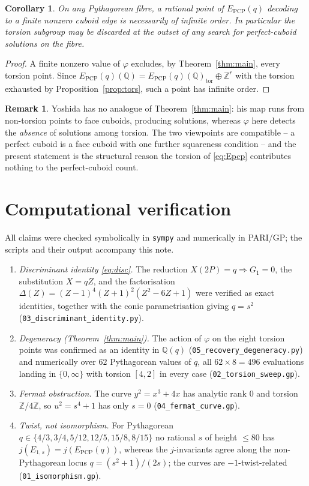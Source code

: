 \documentclass[11pt,reqno]{amsart}
\theoremstyle{plain}
\newtheorem{corollary}{Corollary}
\theoremstyle{definition}
\newtheorem{remark}{Remark}
\newcommand{\Q}{\mathbb{Q}}
\newcommand{\Z}{\mathbb{Z}}
\newcommand{\Epcp}{E_{\mathrm{PCP}}}
\begin{document}
\begin{corollary}\label{cor:nontorsion}
On any Pythagorean fibre, a rational point of $\Epcp(q)$ decoding to a finite nonzero
cuboid edge is necessarily of infinite order. In particular the torsion subgroup may be
discarded at the outset of any search for perfect-cuboid solutions on the fibre.
\end{corollary}

\begin{proof}
A finite nonzero value of $\varphi$ excludes, by Theorem~\ref{thm:main}, every torsion
point. Since $\Epcp(q)(\Q)=\Epcp(q)(\Q)_{\mathrm{tor}}\oplus\Z^{r}$ with the torsion
exhausted by Proposition~\ref{prop:tors}, such a point has infinite order.
\end{proof}

\begin{remark}
Yoshida \cite{Yoshida} has no analogue of Theorem~\ref{thm:main}: his map runs from
non-torsion points to face cuboids, producing solutions, whereas $\varphi$ here detects
the \emph{absence} of solutions among torsion. The two viewpoints are compatible -- a
perfect cuboid is a face cuboid with one further squareness condition -- and the present
statement is the structural reason the torsion of \eqref{eq:Epcp} contributes nothing to
the perfect-cuboid count.
\end{remark}

\section{Computational verification}

All claims were checked symbolically in \texttt{sympy} and numerically in PARI/GP; the
scripts and their output accompany this note.

\begin{enumerate}
\item \emph{Discriminant identity \eqref{eq:disc}.} The reduction $X(2P)=q\Rightarrow
G_{1}=0$, the substitution $X=qZ$, and the factorisation
$\Delta(Z)=(Z-1)^{4}(Z+1)^{2}(Z^{2}-6Z+1)$ were verified as exact identities, together
with the conic parametrisation giving $q=s^{2}$
(\texttt{03\_discriminant\_identity.py}).
\item \emph{Degeneracy (Theorem~\ref{thm:main}).} The action of $\varphi$ on the eight
torsion points was confirmed as an identity in $\Q(q)$
(\texttt{05\_recovery\_degeneracy.py}) and numerically over $62$ Pythagorean values of
$q$, all $62\times8=496$ evaluations landing in $\{0,\infty\}$ with torsion $[4,2]$ in
every case (\texttt{02\_torsion\_sweep.gp}).
\item \emph{Fermat obstruction.} The curve $y^{2}=x^{3}+4x$ has analytic rank $0$ and
torsion $\Z/4\Z$, so $u^{2}=s^{4}+1$ has only $s=0$ (\texttt{04\_fermat\_curve.gp}).
\item \emph{Twist, not isomorphism.} For Pythagorean $q\in\{4/3,3/4,5/12,12/5,15/8,8/15\}$
no rational $s$ of height $\le80$ has $j(E_{1,s})=j(\Epcp(q))$, whereas the
$j$-invariants agree along the non-Pythagorean locus $q=(s^{2}+1)/(2s)$; the curves are
$-1$-twist-related (\texttt{01\_isomorphism.gp}).
\end{enumerate}
\end{document}
